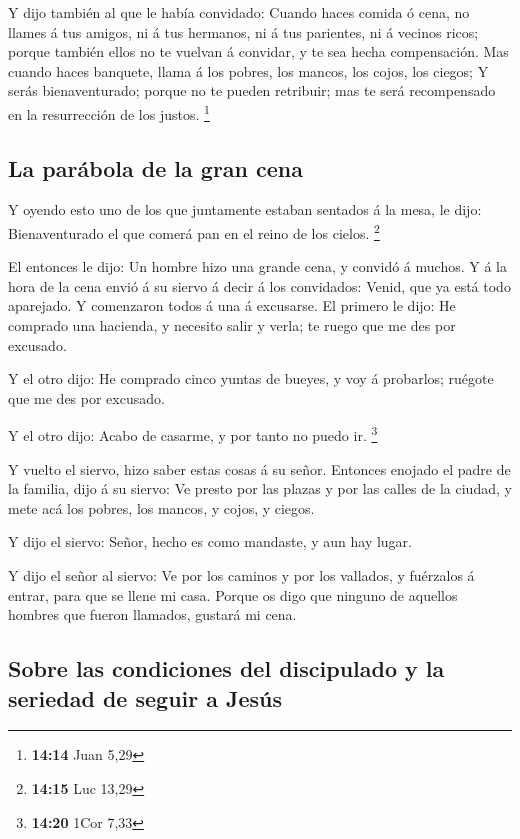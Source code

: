  Y dijo también al que le había convidado: Cuando haces
comida ó cena, no llames á tus amigos, ni á tus hermanos, ni á tus
parientes, ni á vecinos ricos; porque también ellos no te vuelvan á
convidar, y te sea hecha compensación.  Mas cuando haces
banquete, llama á los pobres, los mancos, los cojos, los ciegos;
 Y serás bienaventurado; porque no te pueden retribuir; mas
te será recompensado en la resurrección de los justos. \footnote{\textbf{14:14}
  Juan 5,29}

\hypertarget{la-paruxe1bola-de-la-gran-cena}{%
\subsection{La parábola de la gran
cena}\label{la-paruxe1bola-de-la-gran-cena}}

 Y oyendo esto uno de los que juntamente estaban sentados á
la mesa, le dijo: Bienaventurado el que comerá pan en el reino de los
cielos. \footnote{\textbf{14:15} Luc 13,29}

 El entonces le dijo: Un hombre hizo una grande cena, y
convidó á muchos.  Y á la hora de la cena envió á su siervo
á decir á los convidados: Venid, que ya está todo aparejado.
 Y comenzaron todos á una á excusarse. El primero le dijo:
He comprado una hacienda, y necesito salir y verla; te ruego que me des
por excusado.

 Y el otro dijo: He comprado cinco yuntas de bueyes, y voy
á probarlos; ruégote que me des por excusado.

 Y el otro dijo: Acabo de casarme, y por tanto no puedo ir.
\footnote{\textbf{14:20} 1Cor 7,33}

 Y vuelto el siervo, hizo saber estas cosas á su señor.
Entonces enojado el padre de la familia, dijo á su siervo: Ve presto por
las plazas y por las calles de la ciudad, y mete acá los pobres, los
mancos, y cojos, y ciegos.

 Y dijo el siervo: Señor, hecho es como mandaste, y aun hay
lugar.

 Y dijo el señor al siervo: Ve por los caminos y por los
vallados, y fuérzalos á entrar, para que se llene mi casa. 
Porque os digo que ninguno de aquellos hombres que fueron llamados,
gustará mi cena.

\hypertarget{sobre-las-condiciones-del-discipulado-y-la-seriedad-de-seguir-a-jesuxfas}{%
\subsection{Sobre las condiciones del discipulado y la seriedad de
seguir a
Jesús}\label{sobre-las-condiciones-del-discipulado-y-la-seriedad-de-seguir-a-jesuxfas}}

